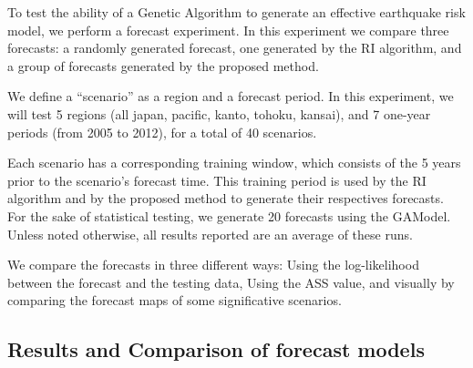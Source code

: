 \documentclass{sig-alternate}
\begin{document}
To test the ability of a Genetic Algorithm to generate an effective
earthquake risk model, we perform a forecast experiment. In this
experiment we compare three forecasts: a randomly generated forecast,
one generated by the RI algorithm, and a group of forecasts generated
by the proposed method.

We define a ``scenario'' as a region and a forecast period. In this
experiment, we will test 5 regions (all japan, pacific, kanto, tohoku,
kansai), and 7 one-year periods (from 2005 to 2012), for a total of 40
scenarios.

Each scenario has a corresponding training window, which consists of
the 5 years prior to the scenario's forecast time. This training
period is used by the RI algorithm and by the proposed method to
generate their respectives forecasts. For the sake of statistical
testing, we generate 20 forecasts using the GAModel. Unless noted
otherwise, all results reported are an average of these runs.

We compare the forecasts in three different ways: Using the
log-likelihood between the forecast and the testing data, Using the
ASS value, and visually by comparing the forecast maps of some
significative scenarios.

\subsection{Results and Comparison of forecast models}
\end{document}
